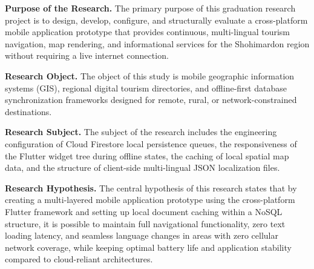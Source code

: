 \documentclass[12pt,a4paper,oneside]{report}
\begin{document}
\noindent\textbf{Purpose of the Research.} The primary purpose of this graduation
research project is to design, develop, configure, and structurally evaluate a
cross-platform mobile application prototype that provides continuous, multi-lingual
tourism navigation, map rendering, and informational services for the Shohimardon
region without requiring a live internet connection.

\noindent\textbf{Research Object.} The object of this study is mobile geographic
information systems (GIS), regional digital tourism directories, and offline-first
database synchronization frameworks designed for remote, rural, or network-constrained
destinations.

\noindent\textbf{Research Subject.} The subject of the research includes the
engineering configuration of Cloud Firestore local persistence queues, the
responsiveness of the Flutter widget tree during offline states, the caching of local
spatial map data, and the structure of client-side multi-lingual JSON localization
files.

\noindent\textbf{Research Hypothesis.} The central hypothesis of this research states
that by creating a multi-layered mobile application prototype using the cross-platform
Flutter framework and setting up local document caching within a NoSQL structure, it is
possible to maintain full navigational functionality, zero text loading latency, and
seamless language changes in areas with zero cellular network coverage, while keeping
optimal battery life and application stability compared to cloud-reliant architectures.
\end{document}
